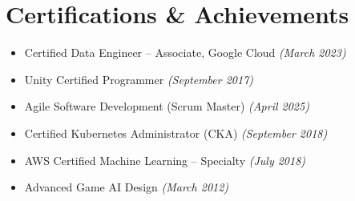 \documentclass[a4paper,11pt]{article}
\begin{document}
\section{Certifications \& Achievements}
\begin{itemize}[noitemsep, topsep=0pt, leftmargin=*, align=left]
    \item Certified Data Engineer – Associate, Google Cloud 
    \hfill \textit{(March 2023)}

    \item Unity Certified Programmer 
    \hfill \textit{(September 2017)}

    \item Agile Software Development (Scrum Master) 
    \hfill \textit{(April 2025)}

    \item Certified Kubernetes Administrator (CKA) 
    \hfill \textit{(September 2018)}

    \item AWS Certified Machine Learning – Specialty 
    \hfill \textit{(July 2018)}

    \item Advanced Game AI Design 
    \hfill \textit{(March 2012)}
\end{itemize}

\end{document}
